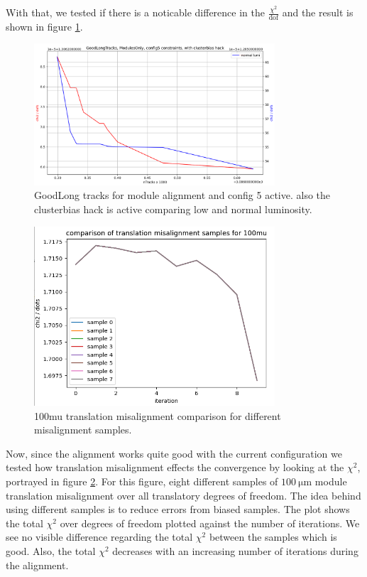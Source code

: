 With that, we tested if there is a noticable difference in the $\frac{\chi^2}{\text{dof}}$
and the result is shown in figure \ref{fig:GL_lumi_low_normal_hack_on}.

\begin{figure}
  \centering
  \includegraphics[width=0.8\textwidth]{plots/feb_2_2022/GL_modules_c5_cb_hackactive_low_normal_lumi.png}
  \caption{GoodLong tracks for module alignment and config 5 active. also the clusterbias hack is active comparing low and normal luminosity.}
  \label{fig:GL_lumi_low_normal_hack_on}
\end{figure}

\begin{figure}
  \centering
  \includegraphics[width=0.8\textwidth]{plots/feb_6_2022/100mu_misalignment_samples_compared.png}
  \caption{100mu translation misalignment comparison for different misalignment samples.}
  \label{fig:100muT}
\end{figure}

Now, since the alignment works quite good with the current configuration we
tested how translation misalignment effects the convergence by looking at the
$\chi^2$, portrayed in figure \ref{fig:100muT}. For this figure, eight different samples of $\SI{100}{\micro\metre}$ module translation misalignment over all translatory
degrees of freedom. The idea behind using different samples is to reduce errors
from biased samples. The plot shows the total $\chi^2$ over degrees of freedom
plotted against the number of iterations. We see no visible difference regarding
the total $\chi^2$ between the samples which is good.
Also, the total $\chi^2$ decreases with an increasing number of iterations
during the alignment.

